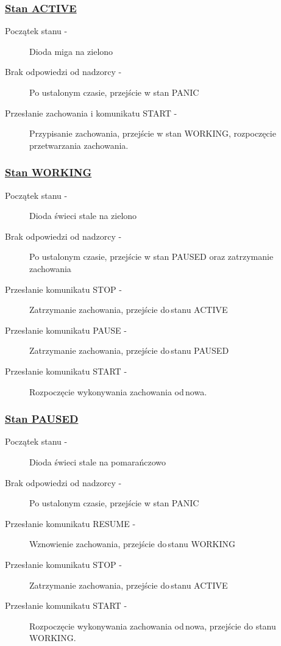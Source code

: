 \subsubsection{\underline{Stan ACTIVE}}

\begin{description}
    \item[Początek stanu -]Dioda miga na zielono
    \item[Brak odpowiedzi od nadzorcy -]Po ustalonym czasie, przejście w stan PANIC
    \item[Przesłanie zachowania i komunikatu START -]Przypisanie zachowania, przejście w stan WORKING, rozpoczęcie przetwarzania zachowania.
\end{description}

\subsubsection{\underline{Stan WORKING}}

\begin{description}
    \item[Początek stanu -]Dioda świeci stale na zielono
    \item[Brak odpowiedzi od nadzorcy -]Po ustalonym czasie, przejście w stan PAUSED oraz zatrzymanie zachowania
    \item[Przesłanie komunikatu STOP -]Zatrzymanie zachowania, przejście do\,stanu ACTIVE
    \item[Przesłanie komunikatu PAUSE -]Zatrzymanie zachowania, przejście do\,stanu PAUSED
    \item[Przesłanie komunikatu START -]Rozpoczęcie wykonywania zachowania od\,nowa.
\end{description}

\subsubsection{\underline{Stan PAUSED}}

\begin{description}
    \item[Początek stanu -]Dioda świeci stale na pomarańczowo
    \item[Brak odpowiedzi od nadzorcy -]Po ustalonym czasie, przejście w stan PANIC
    \item[Przesłanie komunikatu RESUME -]Wznowienie zachowania, przejście do\,stanu WORKING
    \item[Przesłanie komunikatu STOP -]Zatrzymanie zachowania, przejście do\,stanu ACTIVE
    \item[Przesłanie komunikatu START -]Rozpoczęcie wykonywania zachowania od\,nowa, przejście do stanu WORKING.
\end{description}

